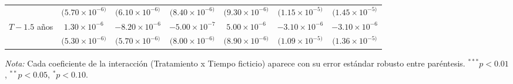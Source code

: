 \begin{table}[htbp]
\begin{adjustbox}{max width=\textwidth}
\begin{tabular}{lcccccc}
         & $(5.70\times 10^{-6)}$ & $(6.10\times 10^{-6)}$ & $(8.40\times 10^{-6)}$ & $(9.30\times 10^{-6)}$ & $(1.15\times 10^{-5)}$ & $(1.45\times 10^{-5)}$ \\
        $T - 1.5$ años & $1.30\times 10^{-6}$ & $-8.20\times 10^{-6}$ & $-5.00\times 10^{-7}$ & $5.00\times 10^{-6}$ & $-3.10\times 10^{-6}$ & $-3.10\times 10^{-6}$ \\
         & $(5.30\times 10^{-6)}$ & $(5.70\times 10^{-6)}$ & $(8.00\times 10^{-6)}$ & $(8.90\times 10^{-6)}$ & $(1.09\times 10^{-5)}$ & $(1.36\times 10^{-5)}$ \\
        \bottomrule
    \end{tabular}
    \end{adjustbox}

    \vspace{0.4em}
    \begin{minipage}{0.93\textwidth}
        \tiny \textit{Nota:} Cada coeficiente de la interacción (Tratamiento x Tiempo ficticio) aparece con su error estándar robusto entre paréntesis. ${}^{***} p<0.01$, ${}^{**} p<0.05$, ${}^{*} p<0.10$.
    \end{minipage}
\end{table}

\clearpage

